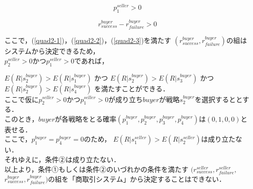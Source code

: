 \begin{equation}
  p^{seller}_1 > 0
\end{equation}

\begin{equation}
  \label{quad2-3}
  r^{buyer}_{success} - r^{buyer}_{failure} > 0
\end{equation}

ここで，(\ref{quad2-1})，(\ref{quad2-2})，(\ref{quad2-3})を満たす
$ (r^{buyer}_{success}, r^{buyer}_{failure})$の組はシステムから決定できるため，\\

$p^{seller}_2>0$かつ$p^{seller}_1>0$であれば，

$E(R|s^{buyer}_2)>E(R|s^{buyer}_1)$
かつ
$E(R|s^{buyer}_2) > E(R|s^{buyer}_3)$
かつ
$E(R|s^{buyer}_2) > E(R|s^{buyer}_4)$
を満たすことができる．\\

ここで仮に$p^{seller}_2>0$かつ$p^{seller}_1>0$が成り立ち$ buyer$が戦略$ s^{buyer}_2$を選択するととする．\\

このとき，$buyer$が各戦略をとる確率$(p^{buyer}_1, p^{buyer}_2, p^{buyer}_3, p^{buyer}_4)$は$ (0, 1, 0, 0)$と表せる．\\

ここで，$ p^{buyer}_1 = p^{buyer}_4 = 0$のため，
$E(R |s^{seller}_1) > E(R |s^{seller}_2)$は成り立たない．\\

それゆえに，条件②は成り立たない．\\

以上より，条件①もしくは条件②のいづれかの条件を満たす
$(r^{seller}_{success}, r^{seller}_{failure},$
$r^{buyer}_{success},r^{buyer}_{failure})$の組を「商取引システム」から決定することはできない．\\

